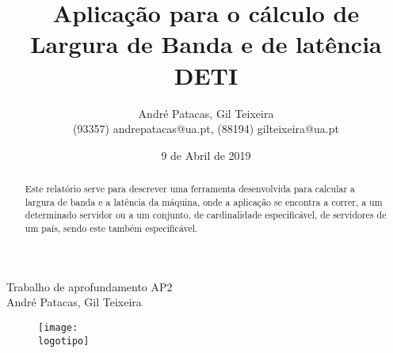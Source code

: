 \documentclass{report}
\begin{document}
%

\def\titulo{Trabalho de aprofundamento AP2}
\def\data{9 de Abril de 2019}
\def\autores{André Patacas, Gil Teixeira}
\def\autorescontactos{(93357) andrepatacas@ua.pt, (88194) gilteixeira@ua.pt}
\def\departamento{DETI}
\def\logotipo{ua.pdf}
%
%
\begin{titlepage}

\begin{center}
%
\vspace*{50mm}
%
{\Huge \titulo}\\ 
%
\vspace{10mm}
%
{\LARGE \autores}\\ 
%
\vspace{30mm}
%
\begin{figure}[h]
\center
\texttt{[image: \\logotipo]}
\end{figure}
%
\vspace{30mm}
\end{center}
%
\begin{flushright}

\end{flushright}
\end{titlepage}

\title{%
{\Huge\textbf{Aplicação para o cálculo de Largura de Banda e de latência}}\\
{\Large \departamento}
}
%
\author{%
    \autores \\
    \autorescontactos 
}

%
\date{\data}
%
\maketitle






\tableofcontents


\clearpage
{}

\begin{abstract}
Este relatório serve para descrever uma ferramenta desenvolvida para calcular a largura de banda e a latência da máquina, onde a aplicação se encontra a correr, a um determinado servidor ou a um conjunto, de cardinalidade especificável, de servidores de um país, sendo este também especificável.

\end{abstract}
\end{document}
